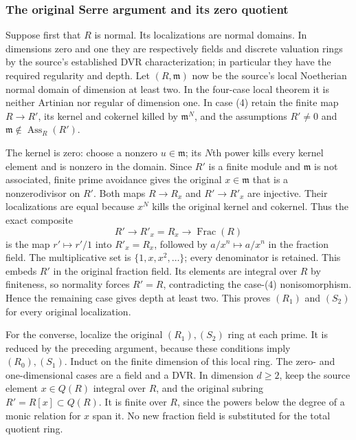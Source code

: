 \subsubsection{The original Serre argument and its zero quotient}\label{algebra-proof-062-the-original-serre-argument-and-its-zero-quotient}

Suppose first that \(R\) is normal. Its localizations are normal domains. In dimensions zero and one they are respectively fields and discrete valuation rings by the source's established DVR characterization; in particular they have the required regularity and depth. Let \((R,\mathfrak m)\) now be the source's local Noetherian normal domain of dimension at least two. In the four-case local theorem it is neither Artinian nor regular of dimension one. In case (4) retain the finite map \(R\to R'\), its kernel and cokernel killed by \(\mathfrak m^N\), and the assumptions \(R'\ne0\) and \(\mathfrak m\notin\operatorname{Ass}_R(R')\).

The kernel is zero: choose a nonzero \(u\in\mathfrak m\); its \(N\)th power kills every kernel element and is nonzero in the domain. Since \(R'\) is a finite module and \(\mathfrak m\) is not associated, finite prime avoidance gives the original \(x\in\mathfrak m\) that is a nonzerodivisor on \(R'\). Both maps \(R\to R_x\) and \(R'\to R'_x\) are injective. Their localizations are equal because \(x^N\) kills the original kernel and cokernel. Thus the exact composite \[
 R'\longrightarrow R'_x=R_x
 \longrightarrow\operatorname{Frac}(R)
\] is the map \(r'\mapsto r'/1\) into \(R'_x=R_x\), followed by \(a/x^n\mapsto a/x^n\) in the fraction field. The multiplicative set is \(\{1,x,x^2,\ldots\}\); every denominator is retained. This embeds \(R'\) in the original fraction field. Its elements are integral over \(R\) by finiteness, so normality forces \(R'=R\), contradicting the case-(4) nonisomorphism. Hence the remaining case gives depth at least two. This proves \((R_1)\) and \((S_2)\) for every original localization.

For the converse, localize the original \((R_1),(S_2)\) ring at each prime. It is reduced by the preceding argument, because these conditions imply \((R_0),(S_1)\). Induct on the finite dimension of this local ring. The zero- and one-dimensional cases are a field and a DVR. In dimension \(d\geq2\), keep the source element \(x\in Q(R)\) integral over \(R\), and the original subring \(R'=R[x]\subset Q(R)\). It is finite over \(R\), since the powers below the degree of a monic relation for \(x\) span it. No new fraction field is substituted for the total quotient ring.


